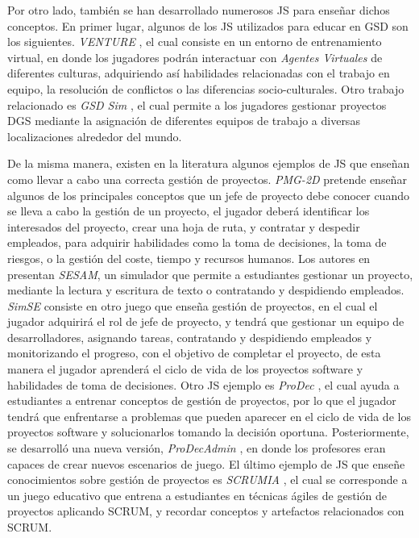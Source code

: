 Por otro lado, también se han desarrollado numerosos JS para enseñar dichos conceptos. En primer lugar, algunos de los JS utilizados para educar en GSD son los siguientes. \emph{VENTURE} \cite{monasor2014global}, el cual consiste en un entorno de entrenamiento virtual, en donde los jugadores podrán interactuar con \emph{Agentes Virtuales} de diferentes culturas, adquiriendo así habilidades relacionadas con el trabajo en equipo, la resolución de conflictos o las diferencias socio-culturales. Otro trabajo relacionado es \emph{GSD Sim} \cite{noll2014gsd}, el cual permite a los jugadores gestionar proyectos DGS mediante la asignación de diferentes equipos de trabajo a diversas localizaciones alrededor del mundo.

De la misma manera, existen en la literatura algunos ejemplos de JS que enseñan como llevar a cabo una correcta gestión de proyectos. \emph{PMG-2D} \cite{lino2015project} pretende enseñar algunos de los principales conceptos que un jefe de proyecto debe conocer cuando se lleva a cabo la gestión de un proyecto, el jugador deberá identificar los interesados del proyecto, crear una hoja de ruta, y contratar y despedir empleados, para adquirir habilidades como la toma de decisiones, la toma de riesgos, o la gestión del coste, tiempo y recursos humanos. Los autores en \cite{drappa2000simulation} presentan \emph{SESAM}, un simulador que permite a estudiantes gestionar un proyecto, mediante la lectura y escritura de texto o contratando y despidiendo empleados. \emph{SimSE} \cite{navarro2004simse} consiste en otro juego que enseña gestión de proyectos, en el cual el jugador adquirirá el rol de jefe de proyecto, y tendrá que gestionar un equipo de desarrolladores, asignando tareas, contratando y despidiendo empleados y monitorizando el progreso, con el objetivo de completar el proyecto, de esta manera el jugador aprenderá el ciclo de vida de los proyectos software y habilidades de toma de decisiones. Otro JS ejemplo es \emph{ProDec} \cite{calderon2013prodec}, el cual ayuda a estudiantes a entrenar conceptos de gestión de proyectos, por lo que el jugador tendrá que enfrentarse a problemas que pueden aparecer en el ciclo de vida de los proyectos software y solucionarlos tomando la decisión oportuna. Posteriormente, se desarrolló una nueva versión, \emph{ProDecAdmin} \cite{calderon2017prodecadmin}, en donde los profesores eran capaces de crear nuevos escenarios de juego. El último ejemplo de JS que enseñe conocimientos sobre gestión de proyectos es \emph{SCRUMIA} \cite{von2013scrumia}, el cual se corresponde a un juego educativo que entrena a estudiantes en técnicas ágiles de gestión de proyectos aplicando SCRUM, y recordar conceptos y artefactos relacionados con SCRUM.